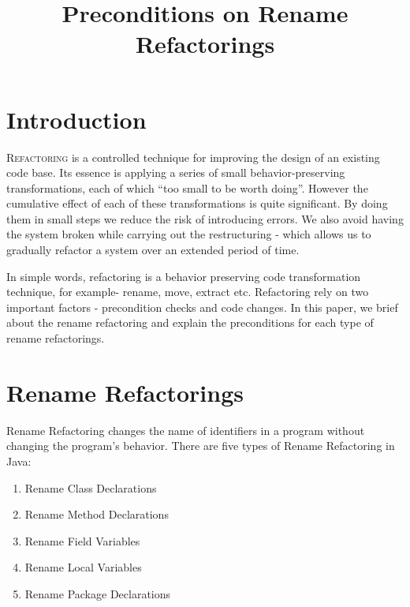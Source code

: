 \documentclass[10pt,conference]{IEEEtran}
\begin{document}
\title{Preconditions on Rename Refactorings}

\author{
\and
{}
\and
{}
}

\maketitle

\section{\textbf{Introduction}}
\lettrine{R}{efactoring} is a controlled technique for improving the design of an existing code base. Its essence is applying a series of small behavior-preserving transformations, each of which ``too small to be worth doing''. However the cumulative effect of each of these transformations is quite significant. By doing them in small steps we reduce the risk of introducing errors. We also avoid having the system broken while carrying out the restructuring - which allows us to gradually refactor a system over an extended period of time.~\cite{Fowler}

In simple words, refactoring is a behavior preserving code transformation technique, for example- rename, move, extract etc. Refactoring rely on two important factors - precondition checks and code changes. In this paper, we brief about the rename refactoring and explain the preconditions for each type of rename refactorings. 

\section{\textbf{Rename Refactorings}}
Rename Refactoring changes the name of identifiers in a program without changing the program's behavior.
There are five types of Rename Refactoring in Java: 
\begin{enumerate}
	\item Rename Class Declarations 
	\item Rename Method Declarations  
	\item Rename Field Variables  
	\item Rename Local Variables  
	\item Rename Package Declarations
\end{enumerate}
\end{document}
